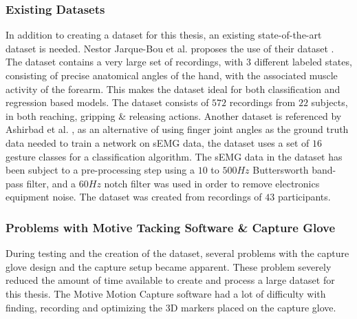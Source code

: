 \documentclass[../main.tex]{subfiles}
\begin{document}
\subsubsection{Existing Datasets}

In addition to creating a dataset for this thesis, an existing state-of-the-art dataset is needed.
Nestor Jarque-Bou et al. \cite{jarque2019} proposes the use of their dataset \cite{kinmusdataset}.
The dataset contains a very large set of recordings, with 3 different labeled states, consisting of precise anatomical angles of the hand, with the associated muscle activity of the forearm.
This makes the dataset ideal for both classification and regression based models.
The dataset consists of $572$ recordings from $22$ subjects, in both reaching, gripping \& releasing actions.
Another dataset is referenced by Ashirbad et al. \cite{ashirbad2022}, as an alternative of using finger joint angles as the ground truth data needed to train a network on sEMG data, the dataset uses a set of $16$ gesture classes for a classification algorithm.
The sEMG data in the dataset has been subject to a pre-processing step using a $10$ to $500Hz$ Buttersworth band-pass filter, and a $60Hz$ notch filter was used in order to remove electronics equipment noise.
The dataset was created from recordings of $43$ participants.

\subsubsection{Problems with Motive Tacking Software \& Capture Glove}
\label{sec:motiveproblems}

During testing and the creation of the dataset, several problems with the capture glove design and the capture setup became apparent.
These problem severely reduced the amount of time available to create and process a large dataset for this thesis.
The Motive Motion Capture software \cite{motive} had a lot of difficulty with finding, recording and optimizing the 3D markers placed on the capture glove.
\end{document}
